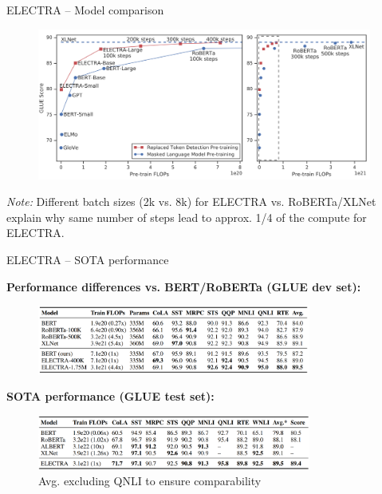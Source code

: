 \begin{frame}{ELECTRA -- Model comparison}
	
\vfill

	\begin{figure}
		\centering
		\includegraphics[width = 11cm]{figure/electra-glue.png}\\ 
	\end{figure}
	
{\footnotesize \textit{Note:} Different batch sizes (2k vs. 8k) for ELECTRA vs. RoBERTa/XLNet explain why same number of steps lead to approx. 1/4 of the compute for ELECTRA.}

\vfill

\end{frame}


\begin{frame}{ELECTRA -- SOTA performance}

\vfill

	\textbf{Performance differences vs. BERT/RoBERTa (GLUE dev set):}

	\begin{figure}
		\centering
		\includegraphics[width = 9cm]{figure/electra-sota1.png}\\ 
	\end{figure}

	\textbf{SOTA performance (GLUE test set):}

	\begin{figure}
		\centering
		\includegraphics[width = 9cm]{figure/electra-sota2.png}\\ 
		{\tiny * Avg. excluding QNLI to ensure comparability}\\
	\end{figure}
	
\vfill

\end{frame}

